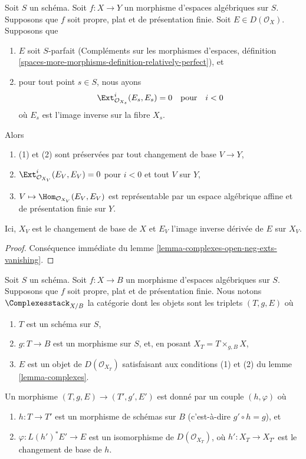 \begin{lemma}
\label{lemma-complexes}
Soit $S$ un schéma. Soit $f : X \to Y$ un morphisme d'espaces algébriques
sur $S$. Supposons que $f$ soit propre, plat et de présentation finie.
Soit $E \in D(\mathcal{O}_X)$.
Supposons que
\begin{enumerate}
\item $E$ soit $S$-parfait (Compléments sur les morphismes d'espaces,
définition \ref{spaces-more-morphisms-definition-relatively-perfect}), et
\item pour tout point $s \in S$, nous ayons
$$
\Ext^i_{\mathcal{O}_{X_s}}(E_s, E_s) = 0
\quad\text{pour}\quad i < 0
$$
où $E_s$ est l'image inverse sur la fibre $X_s$.
\end{enumerate}
Alors
\begin{enumerate}
\item[(a)] (1) et (2) sont préservées par tout changement de base $V \to Y$,
\item[(b)] $\Ext^i_{\mathcal{O}_{X_V}}(E_V, E_V) = 0$ pour $i < 0$ et tout
$V$ sur $Y$,
\item[(c)] $V \mapsto \Hom_{\mathcal{O}_{X_V}}(E_V, E_V)$ est représentable
par un espace algébrique affine et de présentation finie sur $Y$.
\end{enumerate}
Ici, $X_V$ est le changement de base de $X$ et $E_V$ l'image inverse dérivée
de $E$ sur $X_V$.
\end{lemma}

\begin{proof}
Conséquence immédiate du lemme
\ref{lemma-complexes-open-neg-exts-vanishing}.
\end{proof}

\begin{situation}
\label{situation-complexes}
Soit $S$ un schéma. Soit $f : X \to B$ un morphisme d'espaces algébriques
sur $S$. Supposons que $f$ soit propre, plat et de présentation finie.
Nous notons $\Complexesstack_{X/B}$ la catégorie dont les objets sont les
triplets $(T, g, E)$ où
\begin{enumerate}
\item $T$ est un schéma sur $S$,
\item $g : T \to B$ est un morphisme sur $S$, et, en posant
$X_T = T \times_{g, B} X$,
\item $E$ est un objet de $D(\mathcal{O}_{X_T})$ satisfaisant aux conditions
(1) et (2) du lemme \ref{lemma-complexes}.
\end{enumerate}
Un morphisme $(T, g, E) \to (T', g', E')$ est donné par un couple
$(h, \varphi)$ où
\begin{enumerate}
\item $h : T \to T'$ est un morphisme de schémas sur $B$
(c'est-à-dire $g' \circ h = g$), et
\item $\varphi : L(h')^*E' \to E$ est un isomorphisme de
$D(\mathcal{O}_{X_T})$, où $h' : X_T \to X_{T'}$ est le changement de base de
$h$.
\end{enumerate}
\end{situation}

